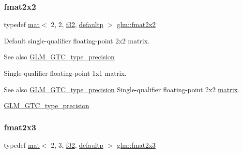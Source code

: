 \subsubsection{\texorpdfstring{fmat2x2}{fmat2x2}}
{\footnotesize\ttfamily typedef \mbox{\hyperlink{structglm_1_1mat}{mat}}$<$ 2, 2, \mbox{\hyperlink{group__gtc__type__precision_ga0ec999b57f5330d9021256e96038df04}{f32}}, \mbox{\hyperlink{namespaceglm_a36ed105b07c7746804d7fdc7cc90ff25a9d21ccd8b5a009ec7eb7677befc3bf51}{defaultp}} $>$ \mbox{\hyperlink{group__gtc__type__precision_gad3b3ab6399b8b960e8994b37521bab86}{glm\+::fmat2x2}}}

Default single-\/qualifier floating-\/point 2x2 matrix. \begin{DoxySeeAlso}{See also}
\mbox{\hyperlink{group__gtc__type__precision}{G\+L\+M\+\_\+\+G\+T\+C\+\_\+type\+\_\+precision}}
\end{DoxySeeAlso}
Single-\/qualifier floating-\/point 1x1 matrix. \begin{DoxySeeAlso}{See also}
\mbox{\hyperlink{group__gtc__type__precision}{G\+L\+M\+\_\+\+G\+T\+C\+\_\+type\+\_\+precision}} Single-\/qualifier floating-\/point 2x2 \mbox{\hyperlink{_s_d_l__opengl__glext_8h_a7b24a3f2f56eb1244ae69dacb4fecb6f}{matrix}}. 

\mbox{\hyperlink{group__gtc__type__precision}{G\+L\+M\+\_\+\+G\+T\+C\+\_\+type\+\_\+precision}} 
\end{DoxySeeAlso}
\mbox{\label{group__gtc__type__precision_ga872da486765a299d84e9e8e6232ed306}} 
\subsubsection{\texorpdfstring{fmat2x3}{fmat2x3}}
{\footnotesize\ttfamily typedef \mbox{\hyperlink{structglm_1_1mat}{mat}}$<$ 2, 3, \mbox{\hyperlink{group__gtc__type__precision_ga0ec999b57f5330d9021256e96038df04}{f32}}, \mbox{\hyperlink{namespaceglm_a36ed105b07c7746804d7fdc7cc90ff25a9d21ccd8b5a009ec7eb7677befc3bf51}{defaultp}} $>$ \mbox{\hyperlink{group__gtc__type__precision_ga872da486765a299d84e9e8e6232ed306}{glm\+::fmat2x3}}}

